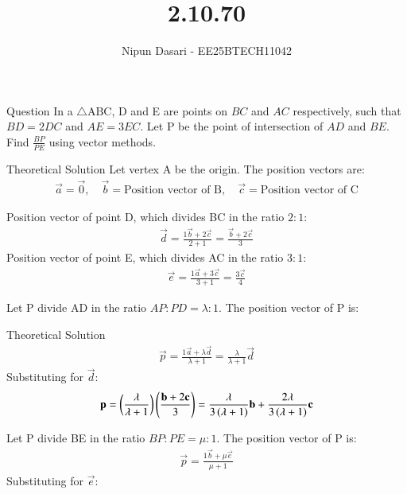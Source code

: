 \documentclass{beamer}
\title %
{2.10.70}
\author %
{Nipun Dasari - EE25BTECH11042}
\begin{document}
	
	
	\frame{\titlepage}
	\begin{frame}{Question}
		In a $\triangle \text{ABC}$, D and E are points on $BC$ and $AC$ respectively, such that $BD = 2DC$ and $AE = 3EC$. Let P be the point of intersection of $AD$ and $BE$. Find $\frac{BP}{PE}$ using vector methods. 
	\end{frame}

		
	\begin{frame}{Theoretical Solution}
			Let vertex A be the origin. The position vectors are:
		\begin{align}
			\vec{a} = \vec{0}, \quad \vec{b} = \text{Position vector of B}, \quad \vec{c} = \text{Position vector of C}
		\end{align}
		
		Position vector of point D, which divides BC in the ratio $2:1$:
		\begin{align}
			\vec{d} = \frac{1\vec{b} + 2\vec{c}}{2+1} = \frac{\vec{b} + 2\vec{c}}{3}
		\end{align}
		Position vector of point E, which divides AC in the ratio $3:1$:
		\begin{align}
			\vec{e} = \frac{1\vec{a} + 3\vec{c}}{3+1} = \frac{3\vec{c}}{4}
		\end{align}
		
		Let P divide AD in the ratio $AP:PD = \lambda:1$. The position vector of P is:
	\end{frame}
	\begin{frame}{Theoretical Solution}
		\begin{align}
			\vec{p} = \frac{1\vec{a} + \lambda\vec{d}}{\lambda+1} = \frac{\lambda}{\lambda+1} \vec{d}
		\end{align}
		Substituting for $\vec{d}$:
		\begin{align}
			\mathbf{p} = \left( \frac{\lambda}{\lambda+1} \right) \left( \frac{\mathbf{b} + 2\mathbf{c}}{3} \right) = \frac{\lambda}{3\left(\lambda+1\right)}\mathbf{b} + \frac{2\lambda}{3\left(\lambda+1\right)}\mathbf{c} \label{eq:1}
		\end{align}
		
		Let P divide BE in the ratio $BP:PE = \mu:1$. The position vector of P is:
		\begin{align}
			\vec{p} = \frac{1\vec{b} + \mu\vec{e}}{\mu+1}
		\end{align}
		Substituting for $\vec{e}$:
	\end{frame}
\end{document}
